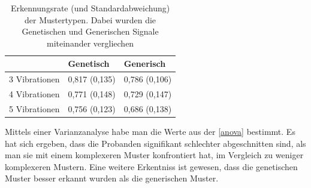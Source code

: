 \begin{table}[]
\centering
\caption{Erkennungsrate (und Standardabweichung) der Mustertypen. Dabei wurden die Genetischen und Generischen Signale miteinander vergliechen}
\label{anova}
\begin{tabular}{l|ll}
              & Genetisch     & Generisch     \\ \hline
3 Vibrationen & 0,817 (0,135) & 0,786 (0,106) \\
4 Vibrationen & 0,771 (0,148) & 0,729 (0,147) \\
5 Vibrationen & 0,756 (0,123) & 0,686 (0,138)
\end{tabular}
\end{table}

Mittels einer Varianzanalyse habe man die Werte aus der \autoref{anova} bestimmt. 
Es hat sich ergeben, dass die Probanden signifikant schlechter abgeschnitten sind, als man sie mit einem komplexeren Muster konfrontiert hat, im Vergleich zu weniger komplexeren Mustern. 
Eine weitere Erkentniss ist gewesen, dass die genetischen Muster besser erkannt wurden als die generischen Muster.














